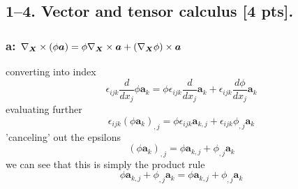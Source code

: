 \bigskip
\subsection*{1--4. \textbf{Vector and tensor calculus} [4 pts].} 
\subsubsection*{a: $\nabla_{\bm{X}} \times (\phi \bm{a}) = \phi \nabla_{\bm{X}} \times \bm{a} + (\nabla_{\bm{X}}\phi) \times \bm{a}$}
converting into index
\begin{equation}
    \epsilon_{ijk}\frac{d}{dx_j}\phi \bm{a}_k = \phi\epsilon_{ijk}\frac{d}{dx_j} \bm{a}_k+\epsilon_{ijk}\frac{d\phi}{dx_j} \bm{a}_k
\end{equation}
evaluating further
\begin{equation}
    \epsilon_{ijk}(\phi\bm{a}_k)_{,j} = \phi\epsilon_{ijk}\bm{a}_{k,j}+\epsilon_{ijk}\phi_{,j}\bm{a}_k
\end{equation}
'canceling' out the epsilons 
\begin{equation}
    (\phi\bm{a}_k)_{,j} = \phi\bm{a}_{k,j}+\phi_{,j}\bm{a}_k
\end{equation}
we can see that this is simply the product rule
\begin{equation}
    \boxed{\phi\bm{a}_{k,j}+\phi_{,j}\bm{a}_k = \phi\bm{a}_{k,j}+\phi_{,j}\bm{a}_k}
\end{equation}

